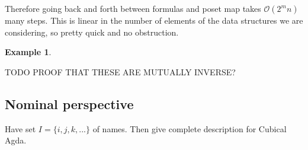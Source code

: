 \documentclass[11pt]{article}
\theoremstyle{definition}
\newtheorem{example}{Example}
\begin{document}
Therefore going back and forth between formulas and poset map takes
$\mathcal{O}(2^mn)$ many steps. This is linear in the number of elements of the
data structures we are considering, so pretty quick and no obstruction.

\begin{example}
\end{example}

TODO PROOF THAT THESE ARE MUTUALLY INVERSE?


\subsection{Nominal perspective}

Have set $I = \{i , j, k , ...\}$ of names. Then give complete description for
Cubical Agda.
\end{document}
